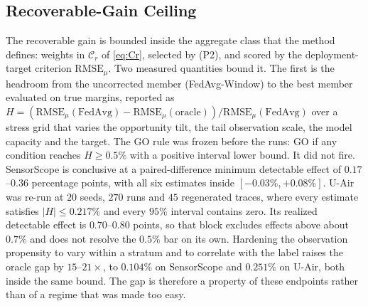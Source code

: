 \documentclass[letterpaper,journal]{IEEEtran}
\begin{document}
\subsection{Recoverable-Gain Ceiling}
\label{subsec:ceiling}

The recoverable gain is bounded inside the aggregate class that the method
defines: weights in $\mathcal{C}_r$ of \eqref{eq:Cr}, selected by (P2), and
scored by the deployment-target criterion $\mathrm{RMSE}_{\mu}$.  Two measured
quantities bound it.  The first is the headroom from the uncorrected member
(FedAvg-Window) to the best member evaluated on true margins, reported as
$H=(\mathrm{RMSE}_{\mu}(\text{FedAvg})-\mathrm{RMSE}_{\mu}(\text{oracle}))/\mathrm{RMSE}_{\mu}(\text{FedAvg})$
over a stress grid that varies the opportunity tilt, the tail observation scale,
the model capacity and the target.  The GO rule was frozen before the runs: GO if
any condition reaches $H\ge0.5\%$ with a positive interval lower bound.  It did
not fire.  SensorScope is conclusive at a paired-difference minimum detectable
effect of $0.17$--$0.36$ percentage points, with all six estimates inside
$[-0.03\%,+0.08\%]$.  U-Air was re-run at $20$ seeds, $270$ runs and $45$
regenerated traces, where every estimate satisfies $|H|\le0.217\%$ and every
$95\%$ interval contains zero.  Its realized detectable effect is $0.70$--$0.80$
points, so that block excludes effects above about $0.7\%$ and does not resolve
the $0.5\%$ bar on its own.  Hardening the observation propensity to vary within
a stratum and to correlate with the label raises the oracle gap by
$15$--$21\times$, to $0.104\%$ on SensorScope and $0.251\%$ on U-Air, both inside
the same bound.  The gap is therefore a property of these endpoints rather
than of a regime that was made too easy.
\end{document}
